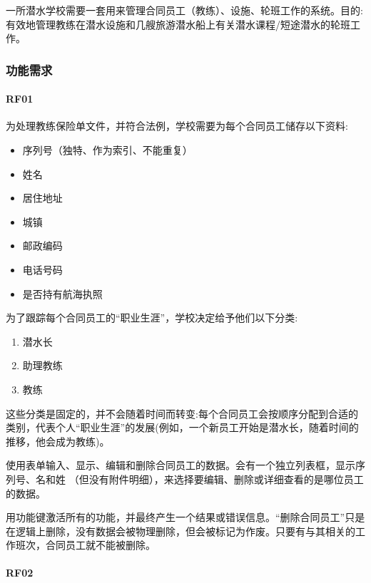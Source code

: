 一所潜水学校需要一套用来管理合同员工（教练）、设施、轮班工作的系统。目的:有效地管理教练在潜水设施和几艘旅游潜水船上有关潜水课程/短途潜水的轮班工作。

\hypertarget{ux529fux80fdux9700ux6c42}{%
\subsubsection{功能需求}\label{ux529fux80fdux9700ux6c42}}

\hypertarget{rf01}{%
\paragraph{RF01}\label{rf01}}

为处理教练保险单文件，并符合法例，学校需要为每个合同员工储存以下资料:

\begin{itemize}
\tightlist
\item
  序列号（独特、作为索引、不能重复）
\item
  姓名
\item
  居住地址
\item
  城镇
\item
  邮政编码
\item
  电话号码
\item
  是否持有航海执照
\end{itemize}

为了跟踪每个合同员工的``职业生涯''，学校决定给予他们以下分类:

\begin{enumerate}
\tightlist
\item
  潜水长
\item
  助理教练
\item
  教练
\end{enumerate}

这些分类是固定的，并不会随着时间而转变:每个合同员工会按顺序分配到合适的类别，代表个人``职业生涯''的发展(例如，一个新员工开始是潜水长，随着时间的推移，他会成为教练)。

使用表单输入、显示、编辑和删除合同员工的数据。会有一个独立列表框，显示序列号、名和姓
（但没有附件明细），来选择要编辑、删除或详细查看的是哪位员工的数据。

用功能键激活所有的功能，并最终产生一个结果或错误信息。``删除合同员工''只是在逻辑上删除，没有数据会被物理删除，但会被标记为作废。只要有与其相关的工作班次，合同员工就不能被删除。

\hypertarget{rf02}{%
\paragraph{RF02}\label{rf02}}

